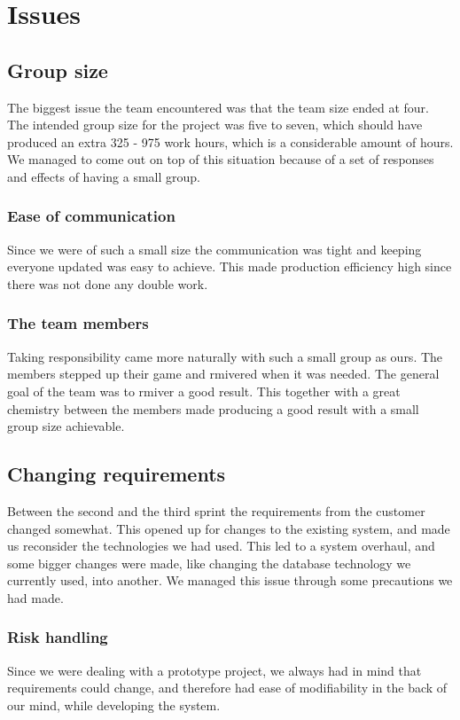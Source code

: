 \section{Issues}

\subsection*{Group size}
The biggest issue the team encountered was that the team size ended at four. The intended group size for the project was five to seven, which should have produced an extra 325 - 975 work hours, which is a considerable amount of hours. We managed to come out on top of this situation because of a set of responses and effects of having a small group.

\subsubsection*{Ease of communication}
Since we were of such a small size the communication was tight and keeping everyone updated was easy to achieve. This made production efficiency high since there was not done any double work.

\subsubsection*{The team members}
Taking responsibility came more naturally with such a small group as ours. The members stepped up their game and rmivered when it was needed. The general goal of the team was to rmiver a good result. This together with a great chemistry between the members made producing a good result with a small group size achievable.


\subsection*{Changing requirements}
Between the second and the third sprint the requirements from the customer changed somewhat. This opened up for changes to the existing system, and made us reconsider the technologies we had used. This led to a system overhaul, and some bigger changes were made, like changing the database technology we currently used, into another. We managed this issue through some precautions we had made.

\subsubsection*{Risk handling}
Since we were dealing with a prototype project, we always had in mind that requirements could change, and therefore had ease of modifiability in the back of our mind, while developing the system.

